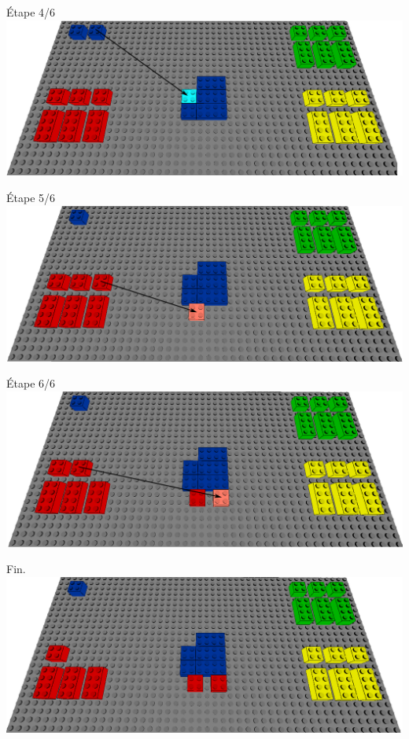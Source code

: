 \documentclass[aspectratio=169]{beamer}
\begin{document}
\begin{frame}
    Étape 4/6
    \vfill
  \includegraphics[width=\linewidth]{step4.png}
\end{frame}

\begin{frame}
    Étape 5/6
    \vfill
  \includegraphics[width=\linewidth]{step5.png}
\end{frame}

\begin{frame}
    Étape 6/6
    \vfill
  \includegraphics[width=\linewidth]{step6.png}
\end{frame}

\begin{frame}
    Fin.
    \vfill
  \includegraphics[width=\linewidth]{end.png}
\end{frame}
\end{document}
